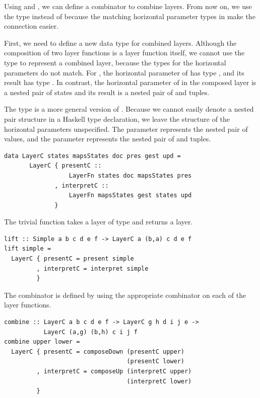 \documentclass[preprint,natbib]{sigplanconf}
\begin{document}
Using  and , we can define a combinator to combine  layers. 
\bc From now on, we use the type  instead of  because the matching horizontal parameter types in  make the connection easier. \ec


First, we need to define a new data type for combined layers. Although the composition of two layer functions is a layer function itself, we cannot use the type  to represent a combined layer, because the types for the horizontal parameters do not match.  For , the horizontal parameter of  has type , and its result has type . In contrast, the horizontal parameter of  in the composed layer is a nested pair of states and its result is a nested pair of  and  tuples. 

The type  is a more general version of . Because we cannot easily denote a nested pair structure in a Haskell type declaration, we leave the structure of the horizontal parameters unspecified. The parameter  represents the nested pair of  values, and the parameter  represents the nested pair of  and  tuples.

\begin{small}
\begin{verbatim}
data LayerC states mapsStates doc pres gest upd =
       LayerC { presentC ::   
                  LayerFn states doc mapsStates pres
              , interpretC :: 
                  LayerFn mapsStates gest states upd
              }
\end{verbatim}
\end{small}

The trivial function  takes a layer of type  and returns a  layer.

\begin{small}
\begin{verbatim}
lift :: Simple a b c d e f -> LayerC a (b,a) c d e f
lift simple = 
  LayerC { presentC = present simple
         , interpretC = interpret simple
         }
\end{verbatim}
\end{small}

The  combinator is defined by using the appropriate  combinator on each of the layer functions. 

\begin{small}
\begin{verbatim}
combine :: LayerC a b c d e f -> LayerC g h d i j e -> 
           LayerC (a,g) (b,h) c i j f
combine upper lower =
  LayerC { presentC = composeDown (presentC upper) 
                                  (presentC lower)
         , interpretC = composeUp (interpretC upper) 
                                  (interpretC lower)
         }
\end{verbatim}
\end{small}
\end{document}
